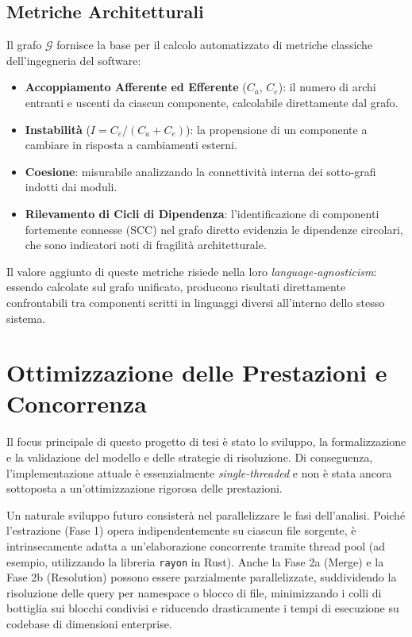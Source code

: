 \subsection{Metriche Architetturali}
Il grafo $\mathcal{G}$ fornisce la base per il calcolo automatizzato
di metriche classiche dell'ingegneria del software:
\begin{itemize}
  \item \textbf{Accoppiamento Afferente ed Efferente} ($C_a$, $C_e$):
    il numero di archi entranti e uscenti da ciascun componente,
    calcolabile direttamente dal grafo.
  \item \textbf{Instabilità} ($I = C_e / (C_a + C_e)$): la
    propensione di un componente a cambiare in risposta a cambiamenti
    esterni.
  \item \textbf{Coesione}: misurabile analizzando la connettività
    interna dei sotto-grafi indotti dai moduli.
  \item \textbf{Rilevamento di Cicli di Dipendenza}: l'identificazione
    di componenti fortemente connesse (SCC) nel grafo diretto
    evidenzia le dipendenze circolari, che sono indicatori noti di
    fragilità architetturale.
\end{itemize}

Il valore aggiunto di queste metriche risiede nella loro
\textit{language-agnosticism}: essendo calcolate sul grafo unificato,
producono risultati direttamente confrontabili tra componenti scritti
in linguaggi diversi all'interno dello stesso sistema.

\section{Ottimizzazione delle Prestazioni e Concorrenza}
Il focus principale di questo progetto di tesi è stato lo sviluppo, la
formalizzazione e la validazione del modello e delle strategie di
risoluzione. Di conseguenza, l'implementazione attuale è essenzialmente
\textit{single-threaded} e non è stata ancora sottoposta a
un'ottimizzazione rigorosa delle prestazioni.

Un naturale sviluppo futuro consisterà nel parallelizzare le fasi
dell'analisi. Poiché l'estrazione (Fase 1) opera indipendentemente su
ciascun file sorgente, è intrinsecamente adatta a un'elaborazione
concorrente tramite thread pool (ad esempio, utilizzando la libreria
\texttt{rayon} in Rust). Anche la Fase 2a (Merge) e la Fase 2b (Resolution)
possono essere parzialmente parallelizzate, suddividendo la risoluzione
delle query per namespace o blocco di file, minimizzando i colli di bottiglia
sui blocchi condivisi e riducendo drasticamente i tempi di esecuzione
su codebase di dimensioni enterprise.

